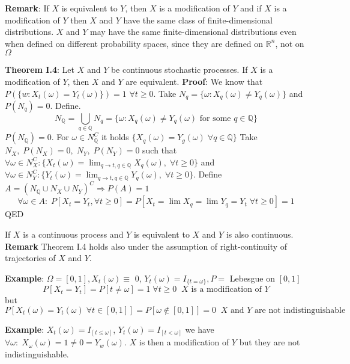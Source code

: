 \documentclass[english]{article}
\newcommand{\R}{\mathbb{R}}
\newcommand{\Q}{\mathbb{Q}}
\newcommand{\note}[1]{\noindent\textbf{#1}}
\begin{document}
\note{Remark}: If $X$ is equivalent to $Y$, then $X$ is a modification of $Y$ and if $X$ is a modification of $Y$ then $X$ and $Y$ have the same class of finite-dimensional distributions. $X$ and $Y$ may have the same finite-dimensional distributions even when defined on different probability spaces, since they are defined on $\R^n$, not on $\Omega$ \newline

\note{Theorem I.4}: Let $X$ and $Y$ be continuous stochastic processes. If $X$ is a modification of $Y$, then $X$ and $Y$ are equivalent.\newline
\textbf{Proof}: We know that $P(\{w: X_t(\omega) = Y_t(\omega)\}) = 1$ $\forall t\geq 0$. Take $N_q = \{\omega: X_q(\omega) \neq Y_q(\omega)\}$ and $P(N_q)=0$. Define.
$$N_{\Q} = \bigcup_{q\in \Q} N_q = \{\omega: X_q(\omega) \neq Y_q (\omega) \text{ for some }q \in \Q\}$$
$P(N_\Q)=0$. For $\omega \in N^C_{\Q}$ it holds $\{X_q(\omega) = Y_g(\omega) \; \forall q \in \Q\}$ \newline
Take $N_X,\; P(N_X)=0,\; N_Y, \; P(N_Y) = 0$ such that $\forall \omega \in N^C_X: \{X_t(\omega) = \lim_{q\to t, q\in \Q} X_q(\omega), \; \forall t\geq 0\}$ and $\forall \omega \in N^C_Y: \{Y_t(\omega) = \lim_{q\to t, q\in \Q} Y_q(\omega),\; \forall t\geq 0\}$. Define $A = (N_\Q \cup N_X \cup N_Y)^C \Rightarrow P(A) = 1$\newline
$$\forall \omega \in A: \; P[X_t = Y_t, \forall t \geq 0] = P[X_t = \lim X_q = \lim Y_q = Y_t\; \forall t\geq 0] = 1$$
QED\newline

If $X$ is a continuous process and $Y$ is equivalent to $X$ and $Y$ is also continuous.\newline
\note{Remark} Theorem I.4 holds also under the assumption of right-continuity of trajectories of $X$ and $Y$. \newline

\note{Example}: $\Omega = [0,1], X_t(\omega) \equiv$ 0, $Y_t(\omega) = I_{\{t=\omega\}}, P =$ Lebesgue on $[0,1]$
$$P[X_t = Y_t] = P[t\neq \omega] = 1 \; \forall t\geq 0 \;\; X\text{ is a modification of } Y$$
but
$$P[X_t(\omega) = Y_t(\omega) \; \forall t\in [0,1] ] = P[\omega \notin [0,1]] = 0 \;\; X \text{ and } Y \text{ are not indistinguishable}$$ 

\note{Example}: $X_t(\omega) = I_{[t\leq \omega]}$, $Y_t(\omega) = I_{[t<\omega]}$ we have $\forall \omega:\; X_\omega(\omega) = 1 \neq 0 = Y_w(\omega)$. $X$ is then a modification of $Y$ but they are not indistinguishable. \newline
\end{document}
